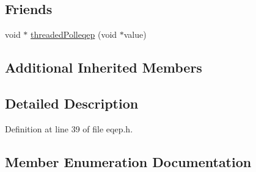 \subsection*{Friends}
\begin{DoxyCompactItemize}
\item 
void $\ast$ \hyperlink{class_hardware_1_1e_q_e_p_a0dd4c4778480f930ef697f898f2d4668}{threaded\+Polleqep} (void $\ast$value)
\end{DoxyCompactItemize}
\subsection*{Additional Inherited Members}


\subsection{Detailed Description}


Definition at line 39 of file eqep.\+h.



\subsection{Member Enumeration Documentation}
\hypertarget{class_hardware_1_1e_q_e_p_a3f97f26c64d49d6f2643a257b7249070}{}

